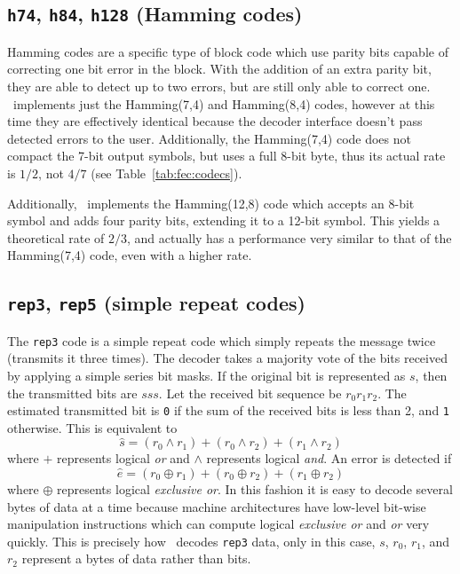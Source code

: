 \subsection{{\tt h74}, {\tt h84}, {\tt h128} (Hamming codes)}
\label{module:fec:hamming}
Hamming codes are a specific type of block
code which use parity bits capable of correcting one bit error in the block.
With the addition of an extra parity bit, they are able to detect up to two
errors, but are still only able to correct one.
\liquid\ implements just the Hamming(7,4) and Hamming(8,4) codes, however at
this time they are effectively identical because the decoder interface
doesn't pass detected errors to the user.
Additionally, the Hamming(7,4) code does not compact the 7-bit output symbols,
but uses a full 8-bit byte, thus its actual rate is $1/2$, not $4/7$ (see
Table~\ref{tab:fec:codecs}).

Additionally, \liquid\ implements the Hamming(12,8) code which accepts an
8-bit symbol and adds four parity bits, extending it to a 12-bit symbol.
This yields a theoretical rate of $2/3$, and actually has a performance very
similar to that of the Hamming(7,4) code, even with a higher rate.

\subsection{{\tt rep3}, {\tt rep5} (simple repeat codes)}
\label{module:fec:rep}
The {\tt rep3} code is a simple repeat code which simply repeats the message
twice (transmits it three times).
The decoder takes a majority vote of the bits received by applying a simple
series bit masks.
If the original bit is represented as $s$, then the transmitted bits are
$s s s$.
Let the received bit sequence be $r_0 r_1 r_2$.
The estimated transmitted bit is {\tt 0} if the sum of the received bits is
less than 2, and {\tt 1} otherwise.
This is equivalent to
\[
    \hat{s} =   (r_0 \land r_1) + 
                (r_0 \land r_2) + 
                (r_1 \land r_2) 
\]
where $+$ represents logical {\it or} and $\land$ represents
logical {\it and}.
An error is detected if
\[
    \hat{e} =   (r_0 \oplus r_1) + 
                (r_0 \oplus r_2) + 
                (r_1 \oplus r_2) 
\]
where $\oplus$ represents logical {\it exclusive or}.
In this fashion it is easy to decode several bytes of data at a time because
machine architectures have low-level bit-wise manipulation instructions which
can compute logical {\it exclusive or} and {\it or} very quickly.
This is precisely how \liquid\ decodes {\tt rep3} data, only in this case,
$s$, $r_0$, $r_1$, and $r_2$ represent a bytes of data rather than bits.

